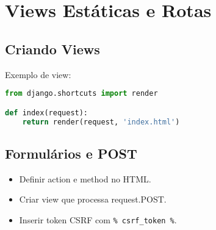 \chapter{Views Est\'aticas e Rotas}
\section{Criando Views}
Exemplo de view:
\begin{lstlisting}[language=Python]
from django.shortcuts import render

def index(request):
    return render(request, 'index.html')
\end{lstlisting}

\section{Formul\'arios e POST}
\begin{itemize}
  \item Definir action e method no HTML.
  \item Criar view que processa request.POST.
  \item Inserir token CSRF com \texttt{{\% csrf\_token \%}}.
\end{itemize}


